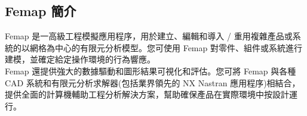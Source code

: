 \begin{itemize}
\section{Femap 簡介}
Femap 是一高級工程模擬應用程序，用於建立、編輯和導入 / 重用複雜產品或系統的以網格為中心的有限元分析模型。您可使用 Femap 對零件、組件或系統進行建模，並確定給定操作環境的行為響應。\\
Femap 還提供強大的數據驅動和圖形結果可視化和評估。您可將 Femap 與各種 CAD 系統和有限元分析求解器(包括業界領先的 NX Nastran 應用程序)相結合，提供全面的計算機輔助工程分析解決方案，幫助確保產品在實際環境中按設計運行。 \\

\end{itemize}
\renewcommand{\baselinestretch}{0.5} %
